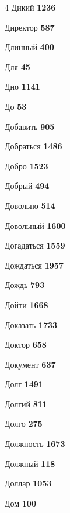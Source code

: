 \begin{multicols}{4}
\noindent Дикий \dotfill \textbf{\color{secondary} 1236}\par
\noindent Директор \dotfill \textbf{\color{secondary} 587}\par
\noindent Длинный \dotfill \textbf{\color{secondary} 400}\par
\noindent Для \dotfill \textbf{\color{secondary} 45}\par
\noindent Дно \dotfill \textbf{\color{secondary} 1141}\par
\noindent До \dotfill \textbf{\color{secondary} 53}\par
\noindent Добавить \dotfill \textbf{\color{secondary} 905}\par
\noindent Добраться \dotfill \textbf{\color{secondary} 1486}\par
\noindent Добро \dotfill \textbf{\color{secondary} 1523}\par
\noindent Добрый \dotfill \textbf{\color{secondary} 494}\par
\noindent Довольно \dotfill \textbf{\color{secondary} 514}\par
\noindent Довольный \dotfill \textbf{\color{secondary} 1600}\par
\noindent Догадаться \dotfill \textbf{\color{secondary} 1559}\par
\noindent Дождаться \dotfill \textbf{\color{secondary} 1957}\par
\noindent Дождь \dotfill \textbf{\color{secondary} 793}\par
\noindent Дойти \dotfill \textbf{\color{secondary} 1668}\par
\noindent Доказать \dotfill \textbf{\color{secondary} 1733}\par
\noindent Доктор \dotfill \textbf{\color{secondary} 658}\par
\noindent Документ \dotfill \textbf{\color{secondary} 637}\par
\noindent Долг \dotfill \textbf{\color{secondary} 1491}\par
\noindent Долгий \dotfill \textbf{\color{secondary} 811}\par
\noindent Долго \dotfill \textbf{\color{secondary} 275}\par
\noindent Должность \dotfill \textbf{\color{secondary} 1673}\par
\noindent Должный \dotfill \textbf{\color{secondary} 118}\par
\noindent Доллар \dotfill \textbf{\color{secondary} 1053}\par
\noindent Дом \dotfill \textbf{\color{secondary} 100}\par

\end{multicols}
